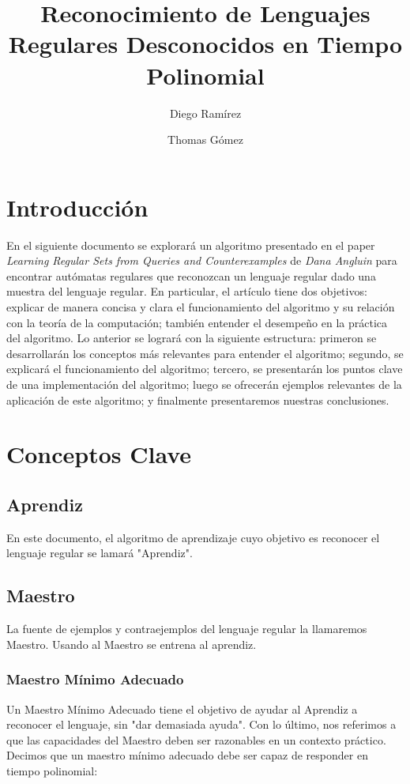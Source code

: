 \documentclass[12pt]{amsart}
\title{Reconocimiento de Lenguajes Regulares Desconocidos en Tiempo Polinomial}
\author{Diego Ramírez }
\author{Thomas Gómez }
\begin{document}
\maketitle

\section{Introducción}

En el siguiente documento se explorará un algoritmo presentado en el paper \textit{Learning Regular Sets from Queries and Counterexamples} de \textit{Dana Angluin} para encontrar autómatas regulares que reconozcan un lenguaje regular dado una muestra del lenguaje regular. En particular, el artículo tiene dos objetivos: explicar de manera concisa y clara el funcionamiento del algoritmo y su relación con la teoría de la computación; también entender el desempeño en la práctica del algoritmo. Lo anterior se logrará con la siguiente estructura: primeron se desarrollarán los conceptos más relevantes para entender el algoritmo; segundo, se explicará el funcionamiento del algoritmo; tercero, se presentarán los puntos clave de una implementación del algoritmo; luego se ofrecerán ejemplos relevantes de la aplicación de este algoritmo; y finalmente presentaremos nuestras conclusiones.

\section{Conceptos Clave}

\subsection{Aprendiz}
En este documento, el algoritmo de aprendizaje cuyo objetivo es reconocer el lenguaje regular se lamará "Aprendiz".

\subsection{Maestro}
La fuente de ejemplos y contraejemplos del lenguaje regular la llamaremos Maestro. Usando al Maestro se entrena al aprendiz.
\subsubsection{Maestro Mínimo Adecuado}
Un Maestro Mínimo Adecuado tiene el objetivo de ayudar al Aprendiz a reconocer el lenguaje, sin "dar demasiada ayuda". Con lo último, nos referimos a que las capacidades del Maestro deben ser razonables en un contexto práctico. Decimos que un maestro mínimo adecuado debe ser capaz de responder en tiempo polinomial:
\end{document}
